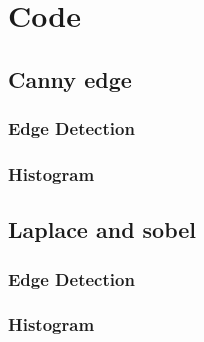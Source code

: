 \documentclass[BTech]{srmuthesis}
\begin{document}

\chapter{Code}
\section{Canny edge}

\subsection{Edge Detection}



\subsection{Histogram}



\section{Laplace and sobel}

\subsection{Edge Detection}



\subsection{Histogram}







\end{document}
